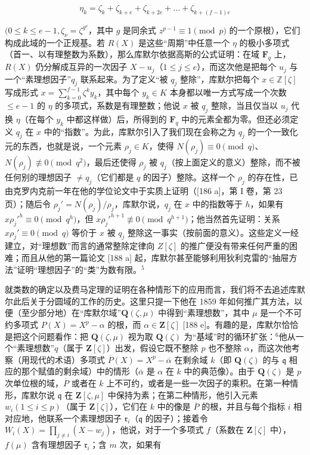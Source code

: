 \[
\eta_ {k} = \zeta_ {k} + \zeta_ {k + e} + \zeta_ {k + 2 e} + \dots + \zeta_ {k + (f - 1) e}
\]

\((0 \leq k \leq e - 1, \zeta_{\nu} = \zeta^{g^{\nu}}\)，其中 \(g\) 是同余式 \(z^{p-1} \equiv 1 \pmod{p}\) 的一个原根），它们构成此域的一个正规基。若 \(R(X)\) 是这些“周期”中任意一个 \(\eta\) 的极小多项式（首一、以有理整数为系数），那么库默尔依据高斯的公式证明：在域 \(\mathbf{F}_{q}\) 上，\(R(X)\) 仍分解成互异的一次因子 \(X - u_{j}\)（\(1 \leq j \leq e\)），而这次他是把每个 \(u_{j}\) 与一个“素理想因子”\(q_{j}\) 联系起来。为了定义“被 \(q_{j}\) 整除”，库默尔把每个 \(x \in \mathbb{Z}[\zeta]\) 写成形式 \(x = \sum_{k=0}^{f-1} \zeta^{k} y_{k}\)，其中每个 \(y_{k} \in K\) 本身都以唯一方式写成一个次数 \(\leq e-1\) 的 \(\eta\) 的多项式，系数是有理整数；他说 \(x\) 被 \(q_{j}\) 整除，当且仅当以 \(u_{j}\) 代换 \(\eta\)（在每个 \(y_{k}\) 中都这样做）后，所得到的 \(\mathbf{F}_{q}\) 中的元素全都为零。但还必须定义 \(q_{j}\) 在 \(x\) 中的“指数”。为此，库默尔引入了我们现在会称之为 \(q_{j}\) 的一个一致化元的东西，也就是说，一个元素 \(\rho_{j} \in K\)，使得 \(N(\rho_{j}) \equiv 0 \pmod{q}\)、\(N(\rho_{j}) \not\equiv 0 \pmod{q^{2}}\)，最后还使得 \(\rho_{j}\) 被 \(q_{j}\)（按上面定义的意义）整除，而不被任何别的理想因子 \(\neq q_{j}\)（它们都是 \(q\) 的因子）整除。这样一个 \(\rho_{j}\) 的存在性，已由克罗内克前一年在他的学位论文中于实质上证明（{[}186 a{]}，第 I 卷，第 23 页）；随后令 \(\rho_{j}' = N(\rho_{j}) / \rho_{j}\)，库默尔说，\(q_{j}\) 在 \(x\) 中的指数等于 \(h\)，如果有 \(x\rho_{j}'^{h} \equiv 0 \pmod{q^{h}}\)，但 \(x\rho_{j}'^{h+1} \not\equiv 0 \pmod{q^{h+1}}\)；他当然首先证明：关系 \(x\rho_{j}' \equiv 0 \pmod{q}\) 等价于 \(x\) 被 \(q_{j}\) 整除这一事实（按前面的意义）。这些定义一经建立，对“理想数”而言的通常整除定律向 \(Z[\zeta]\) 的推广便没有带来任何严重的困难；而且从他的第一篇论文 {[}188 a{]} 起，库默尔甚至能够利用狄利克雷的“抽屉方法”证明“理想因子”的“类”为数有限。\(^{5}\)

就类数的确定以及费马定理的证明在各种情形下的应用而言，我们将不去追述库默尔此后关于分圆域的工作的历史。这里只提一下他在 1859 年如何推广其方法，以便（至少部分地）在“库默尔域”\(\mathbf{Q}(\zeta, \mu)\) 中得到“素理想数”，其中 \(\mu\) 是一个不可约多项式 \(P(X) = X^p - \alpha\) 的根，而 \(\alpha \in \mathbf{Z}[\zeta]\) {[}188 e{]}。有趣的是，库默尔恰恰是把这个问题看作：把 \(\mathbf{Q}(\zeta, \mu)\) 视为取 \(\mathbf{Q}(\zeta)\) 为“基域”时的循环扩张：\(^6\)他从一个“素理想数”\(q\)（属于 \(\mathbf{Z}[\zeta]\)）出发，假设它既不整除 \(p\) 也不整除 \(\alpha\)，而这次他考察（用现代的术语）多项式 \(\overline{P}(X) = X^p - \overline{\alpha}\) 在剩余域 \(k\)（即 \(\mathbf{Q}(\zeta)\) 的与 \(\mathfrak{q}\) 相应的那个赋值的剩余域）中的情形（\(\overline{\alpha}\) 是 \(\alpha\) 在 \(k\) 中的典范像）。由于 \(\mathbf{Q}(\zeta)\) 是 \(p\) 次单位根的域，\(\overline{P}\) 或者在 \(k\) 上不可约，或者是一些一次因子的乘积。在第一种情形，库默尔说 \(\mathfrak{q}\) 在 \(\mathbf{Z}[\zeta, \mu]\) 中保持为素；在第二种情形，他引入元素 \(w_i(1 \leq i \leq p)\)（属于 \(\mathbf{Z}[\zeta]\)），它们在 \(k\) 中的像是 \(\overline{P}\) 的根，并且与每个指标 \(i\) 相对应地，他联系一个素理想因子 \(\mathfrak{r}_i\)（\(\mathfrak{q}\) 的因子）；接着令 \(W_i(X) = \prod_{j \neq i}(X - w_j)\)，他说，对于一个多项式 \(f\)（系数在 \(\mathbf{Z}[\zeta]\) 中），\(f(\mu)\) 含有理想因子 \(\mathfrak{r}_i\)；含 \(m\) 次，如果有

